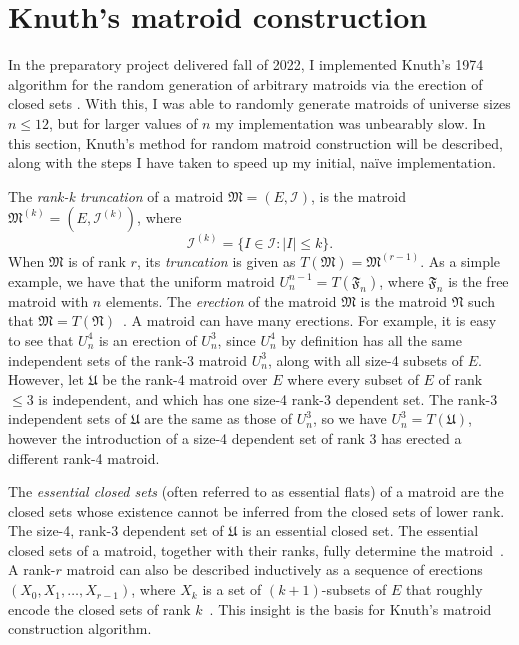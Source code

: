 \section{Knuth's matroid construction}
In the preparatory project delivered fall of 2022, I implemented Knuth's 1974 algorithm for the random generation of arbitrary matroids via the erection of closed sets \cite{knuth-1975}. With this, I was able to randomly generate matroids of universe sizes $n \leq 12$, but for larger values of $n$ my implementation was unbearably slow. In this section, Knuth's method for random matroid construction will be described, along with the steps I have taken to speed up my initial, naïve implementation.

The \textit{rank-k truncation} of a matroid $\mathfrak{M} = (E, \mathcal{I})$, is the matroid $\mathfrak{M}^{(k)} = (E, \mathcal{I}^{(k)})$, where
$$\mathcal{I}^{(k)} = \{ I \in \mathcal{I} : |I| \leq k \}.$$
When $\mathfrak{M}$ is of rank $r$, its \textit{truncation} is given as $T(\mathfrak{M}) = \mathfrak{M}^{(r-1)}$. As a simple example, we have that the uniform matroid $U_n^{n-1} = T(\mathfrak{F}_n)$, where $\mathfrak{F}_n$ is the free matroid with $n$ elements. The \textit{erection} of the matroid $\mathfrak{M}$ is the matroid $\mathfrak{N}$ such that $\mathfrak{M} = T(\mathfrak{N})$~\cite{Crapo1970}. A matroid can have many erections. For example, it is easy to see that $U_n^4$ is an erection of $U_n^3$, since $U_n^4$ by definition has all the same independent sets of the rank-3 matroid $U_n^3$, along with all size-4 subsets of $E$. However, let $\mathfrak{U}$ be the rank-4 matroid over $E$ where every subset of $E$ of rank $\leq 3$ is independent, and which has one size-4 rank-3 dependent set. The rank-3 independent sets of $\mathfrak{U}$ are the same as those of $U_n^3$, so we have $U_n^3 = T({\mathfrak{U}})$, however the introduction of a size-4 dependent set of rank 3 has erected a different rank-4 matroid.

The \textit{essential closed sets} (often referred to as essential flats) of a matroid are the closed sets whose existence cannot be inferred from the closed sets of lower rank. The size-4, rank-3 dependent set of $\mathfrak{U}$ is an essential closed set. The essential closed sets of a matroid, together with their ranks, fully determine the matroid~\cite{kelly-1978}. A rank-$r$ matroid can also be described inductively as a sequence of erections $(X_0, X_1, \dots, X_{r-1})$, where $X_k$ is a set of $(k+1)$-subsets of $E$ that roughly encode the closed sets of rank $k$~\cite{pendavingh2016enumerating}. This insight is the basis for Knuth's matroid construction algorithm.

